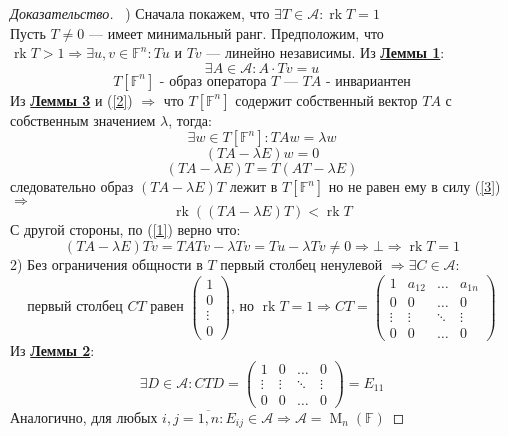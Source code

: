 \documentclass[a4paper, 14pt]{extarticle}
\theoremstyle{definition}
\begin{document}
\begin{proof}[Доказательство]
	~) Сначала покажем, что \(\exists T \in \mathcal{A} : \operatorname{rk} T = 1\)
	\\
	Пусть \(T \neq 0\) --- имеет минимальный ранг. Предположим, что \(\operatorname{rk} T > 1 \Rightarrow \exists u, v \in \mathbb{F}^n : Tu \text{ и } Tv\) --- линейно независимы. Из \hyperref[lm2_1]{\textbf{Леммы 1}}:
	\[\exists A \in \mathcal{A} : A \cdot Tv = u \label{1} \tag{1}\]
	\[T[\mathbb{F}^n] \text{ - образ оператора } T \text{ --- } TA \text{ - инвариантен} \tag{2} \label{2}\]
	Из \hyperref[lm2_3]{\textbf{Леммы 3}} и (\ref{2}) \(\Rightarrow\) что \(T[\mathbb{F}^n]\) содержит собственный вектор \(TA\) с собственным значением \(\lambda\), тогда:
	\[\exists w \in T[\mathbb{F}^n]: TAw = \lambda w\]
	\[(TA - \lambda E)w = 0 \label{3} \tag{3}\]
	\[(TA -\lambda E)T = T(AT - \lambda E)\]
	следовательно образ \((TA - \lambda E)T\) лежит в \(T[\mathbb{F}^n]\) но не равен ему в силу (\ref{3}) \(\Rightarrow \) \[\operatorname{rk}((TA - \lambda E)T) < \operatorname{rk}T\]
	С другой стороны, по (\ref{1}) верно что:
	\[(TA - \lambda E)Tv = TATv - \lambda Tv = Tu - \lambda Tv \neq 0 \Rightarrow \bot \Rightarrow \operatorname{rk}T = 1\]
	2) Без ограничения общности в \(T\) первый столбец ненулевой \(\Rightarrow \exists C \in \mathcal{A}:\)
	\[\text{первый столбец \(CT\) равен } \left(
		\begin{array}{c}
			1\\
			0\\
			\vdots\\
			0
		\end{array}
	\right) \text{, но } \operatorname{rk}T = 1 \Rightarrow CT = \left(
		\begin{array}{cccc}
			1&a_{12}&\hdots&a_{1n}\\
			0&0&\hdots&0\\
			\vdots&\vdots&\ddots&\vdots\\
			0&0&\hdots&0
		\end{array}
	\right)\]
	Из \hyperref[lm2_2]{\textbf{Леммы 2}}:
	\[\exists D \in \mathcal{A}: CTD = \left(
		\begin{array}{cccc}
			1&0&\hdots&0\\
			\vdots&\vdots&\ddots&\vdots\\
			0&0&\hdots&0
		\end{array}
	\right) = E_{11}\]
	Аналогично, для любых \(i, j = \overline{1, n}: E_{ij} \in \mathcal{A} \Rightarrow \mathcal{A} = \operatorname{M}_n(\mathbb{F})\)
\end{proof}
\end{document}
